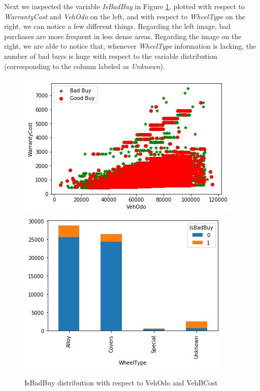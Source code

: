 \documentclass{article}
\begin{document}
	
	Next we inspected the variable \emph{IsBadBuy} in Figure \ref{fig:badbuys}, plotted with respect to \emph{WarrantyCost} and \emph{VehOdo} on the left, and with respect to \emph{WheelType} on the right, we can notice a few different things. Regarding the left image, bad purchases are more frequent in less dense areas. Regarding the image on the right, we are able to notice that, whenever \emph{WheelType} information is lacking, the number of bad buys is huge with respect to the variable distribution (corresponding to the column labeled as \emph{Unknown}).
	
	\begin{figure}[H]
		\centering
		\includegraphics[width=.4\textwidth, keepaspectratio]{badbuys} \hspace{1cm}
		\includegraphics[width=.33\textwidth, keepaspectratio]{wheeltype}
		\caption{IsBadBuy distribution with respect to VehOdo and VehBCost}
		\label{fig:badbuys}
	\end{figure}
	
\end{document}
